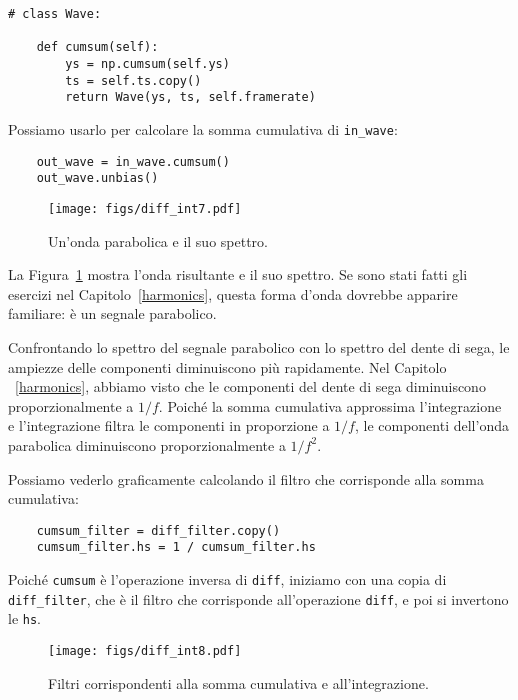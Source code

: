 \documentclass[12pt]{book} \usepackage[width=5.5in,height=8.5in, hmarginratio=3:2,vmarginratio=1:1]{geometry}
\begin{document}
\begin{verbatim} 
# class Wave:

    def cumsum(self):
        ys = np.cumsum(self.ys)
        ts = self.ts.copy()
        return Wave(ys, ts, self.framerate)
 \end{verbatim} 

Possiamo usarlo per calcolare la somma cumulativa di \verb"in_wave":

\begin{verbatim} 
    out_wave = in_wave.cumsum()
    out_wave.unbias()
 \end{verbatim} 

\begin{figure} 

\centerline{\texttt{[image: figs/diff\_int7.pdf]}} \caption{Un'onda parabolica e il suo spettro.} \label{fig.diff_int7} \end{figure} 

La Figura~\ref{fig.diff_int7} mostra l'onda risultante e il suo spettro. Se sono stati fatti gli esercizi nel Capitolo~\ref{harmonics}, questa forma d'onda dovrebbe apparire familiare: è un segnale parabolico.

Confrontando lo spettro del segnale parabolico con lo spettro del dente di sega, le ampiezze delle componenti diminuiscono più rapidamente. Nel Capitolo ~\ref{harmonics}, abbiamo visto che le componenti del dente di sega diminuiscono proporzionalmente a $1/f$. Poiché la somma cumulativa approssima l'integrazione e l'integrazione filtra le componenti in proporzione a $1/f$, le componenti dell'onda parabolica diminuiscono proporzionalmente a $1/f^2$.

Possiamo vederlo graficamente calcolando il filtro che corrisponde alla somma cumulativa:

\begin{verbatim} 
    cumsum_filter = diff_filter.copy()
    cumsum_filter.hs = 1 / cumsum_filter.hs
 \end{verbatim} 

Poiché {\tt cumsum} è l'operazione inversa di {\tt diff}, iniziamo con una copia di \verb"diff_filter", che è il filtro che corrisponde all'operazione {\tt diff}, e poi si invertono le {\tt hs}.

\begin{figure} 

\centerline{\texttt{[image: figs/diff\_int8.pdf]}} \caption{Filtri corrispondenti alla somma cumulativa e all'integrazione.} \label{fig.diff_int8} \end{figure} 
\end{document}
